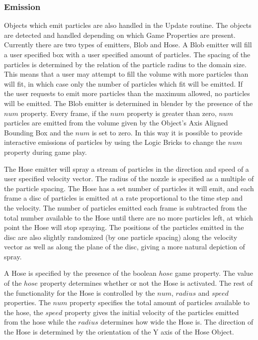 \subsubsection{Emission}
Objects which emit particles are also handled in the Update routine. The
objects are detected and handled depending on which Game Properties are
present. Currently there are two types of emitters, Blob and Hose. A Blob
emitter will fill a user specified box with a user specified amount of
particles. The spacing of the particles is determined by the relation of the
particle radius to the domain size. This means that a user may attempt to fill
the volume with more particles than will fit, in which case only the number of
particles which fit will be emitted. If the user requests to emit more
particles than the maximum allowed, no particles will be emitted.
The Blob emitter is determined in blender by the presence of the $num$
property. Every frame, if the $num$ property is greater than zero, $num$
particles are emitted from the volume given by the Object's Axis Aligned
Bounding Box and the $num$ is set to zero. In this way it is possible to
provide interactive emissions of particles by using the Logic Bricks to change
the $num$ property during game play.

The Hose emitter will spray a stream of particles in the direction and speed of
a user specified velocity vector. The radius of the nozzle is specified as a
multiple of the particle spacing. The Hose has a set number of particles it
will emit, and each frame a disc of particles is emitted at a rate proportional
to the time step and the velocity. The number of particles emitted each frame
is subtracted from the total number available to the Hose until there are no
more particles left, at which point the Hose will stop spraying. The positions
of the particles emitted in the disc are also slightly randomized (by one
particle spacing) along the velocity vector as well as along the plane of the
disc, giving a more natural depiction of spray.

A Hose is specified by the presence of the boolean $hose$ game property. The
value of the $hose$ property determines whether or not the Hose is activated.
The rest of the functionality for the Hose is controlled by the $num$, $radius$
and $speed$ properties. The $num$ property specifies the total amount of
particles available to the hose, the $speed$ property gives the initial
velocity of the particles emitted from the hose while the $radius$ determines
how wide the Hose is. The direction of the Hose is determined by the
orientation of the Y axis of the Hose Object.

